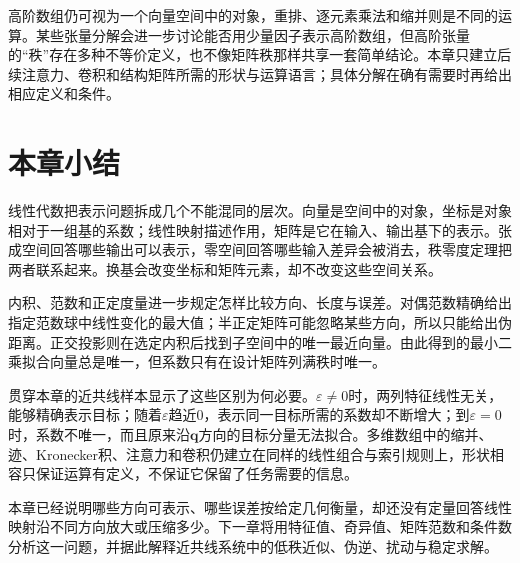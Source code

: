 高阶数组仍可视为一个向量空间中的对象，重排、逐元素乘法和缩并则是不同的运算。某些张量分解会进一步讨论能否用少量因子表示高阶数组，但高阶张量的“秩”存在多种不等价定义，也不像矩阵秩那样共享一套简单结论。本章只建立后续注意力、卷积和结构矩阵所需的形状与运算语言；具体分解在确有需要时再给出相应定义和条件。

\section{本章小结}
\label{sec:linear-algebra-summary}

线性代数把表示问题拆成几个不能混同的层次。向量是空间中的对象，坐标是对象相对于一组基的系数；线性映射描述作用，矩阵是它在输入、输出基下的表示。张成空间回答哪些输出可以表示，零空间回答哪些输入差异会被消去，秩零度定理把两者联系起来。换基会改变坐标和矩阵元素，却不改变这些空间关系。

内积、范数和正定度量进一步规定怎样比较方向、长度与误差。对偶范数精确给出指定范数球中线性变化的最大值；半正定矩阵可能忽略某些方向，所以只能给出伪距离。正交投影则在选定内积后找到子空间中的唯一最近向量。由此得到的最小二乘拟合向量总是唯一，但系数只有在设计矩阵列满秩时唯一。

贯穿本章的近共线样本显示了这些区别为何必要。$\varepsilon\neq0$时，两列特征线性无关，能够精确表示目标；随着$\varepsilon$趋近$0$，表示同一目标所需的系数却不断增大；到$\varepsilon=0$时，系数不唯一，而且原来沿$\bm{q}$方向的目标分量无法拟合。多维数组中的缩并、迹、Kronecker积、注意力和卷积仍建立在同样的线性组合与索引规则上，形状相容只保证运算有定义，不保证它保留了任务需要的信息。

本章已经说明哪些方向可表示、哪些误差按给定几何衡量，却还没有定量回答线性映射沿不同方向放大或压缩多少。下一章将用特征值、奇异值、矩阵范数和条件数分析这一问题，并据此解释近共线系统中的低秩近似、伪逆、扰动与稳定求解。
